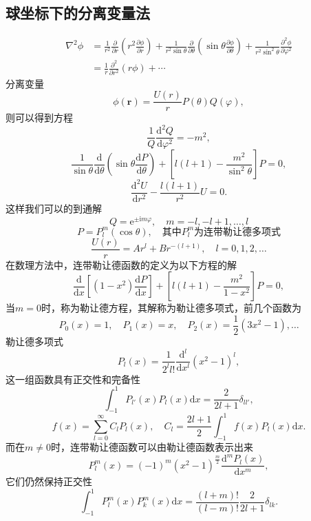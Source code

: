 \documentclass[UTF8]{ctexbook}
\newcommand{\e}{\mathrm{e}}
\renewcommand{\d}{\mathrm{d}}
\renewcommand{\b}{\boldsymbol}
\renewcommand{\i}{\mathrm{i}}
\numberwithin{equation}{chapter}
\begin{document}
	\subsection{球坐标下的分离变量法}
	\begin{align*}
		\nabla^2 \phi&=\frac{1}{r^2}\frac{\partial }{\partial r}\left(r^2\frac{\partial \phi}{\partial r}\right)+\frac{1}{r^2\sin\theta}\frac{\partial }{\partial \theta}\left(\sin\theta\frac{\partial \phi}{\partial \theta}\right)+\frac{1}{r^2\sin^2\theta}\frac{\partial^2\phi}{\partial \varphi^2} \\
		&=\frac{1}{r}\frac{\partial^2}{\partial r^2}(r\phi)+\cdots
	\end{align*}
	分离变量
	\[\phi(\b{r})=\frac{U(r)}{r}P(\theta)Q(\varphi),\]
	则可以得到方程
	\[\frac{1}{Q}\frac{\d^2 Q}{\d \varphi^2}=-m^2,\]
	\[\frac{1}{\sin\theta}\frac{\d }{\d \theta}\left(\sin\theta\frac{\d P}{\d \theta}\right)+\left[l(l+1)-\frac{m^2}{\sin^2\theta}\right]P=0,\]
	\[\frac{\d^2 U}{\d r^2}-\frac{l(l+1)}{r^2}U=0.\]
	这样我们可以的到通解
	\[Q=\e^{\pm\i m \varphi},\quad m=-l,-l+1,\dots,l\]
	\[P=P_{l}^m(\cos\theta),\quad\text{其中$P_{l}^m$为连带勒让德多项式}\]
	\[\frac{U(r)}{r}=Ar^l+Br^{-(l+1)},\quad l=0,1,2,\dots\]
	在数理方法中，连带勒让德函数的定义为以下方程的解
	\[\frac{\d }{\d x}\left[(1-x^2)\frac{\d P}{\d x}\right]+\left[l(l+1)-\frac{m^2}{1-x^2}\right] P=0,\]
	当$m=0$时，称为勒让德方程，其解称为勒让德多项式，前几个函数为
	\[P_0(x)=1,\quad P_1(x)=x,\quad P_2(x)=\frac{1}{2}(3x^2-1),\dots\]
	勒让德多项式
	\[P_l(x)=\frac{1}{2^l l!}\frac{\d^l}{\d x^l}(x^2-1)^l,\]
	这一组函数具有正交性和完备性
	\[\int_{-1}^1 P_{l'}(x)P_l(x)\d x=\frac{2}{2l+1}\delta_{ll'},\]
	\[f(x)=\sum_{l=0}^\infty  C_l P_l(x),\quad C_l=\frac{2l+1}{2}\int_{-1}^1 f(x)P_l(x)\d x.\]
	而在$m\neq0$时，连带勒让德函数可以由勒让德函数表示出来
	\[P_l^m(x)=(-1)^m(x^2-1)^{\frac{m}{2}}\frac{\d^m P_l(x)}{\d x^m},\]
	它们仍然保持正交性
	\[\int_{-1}^1 P_l^m(x)P_k^m(x)\d x=\frac{(l+m)!}{(l-m)!}\frac{2}{2l+1}\delta_{lk}.\]
	
\end{document}
